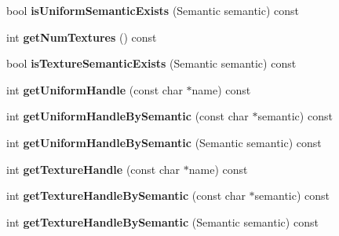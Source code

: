 \begin{DoxyCompactItemize}
\item 
bool {\bfseries is\+Uniform\+Semantic\+Exists} (Semantic semantic) const \hypertarget{class_magnum_1_1_visual_effect_a49f472caf85fc12e50f760351d88979e}{}\label{class_magnum_1_1_visual_effect_a49f472caf85fc12e50f760351d88979e}

\item 
int {\bfseries get\+Num\+Textures} () const \hypertarget{class_magnum_1_1_visual_effect_a121cbbb66895b72a28629018d3183135}{}\label{class_magnum_1_1_visual_effect_a121cbbb66895b72a28629018d3183135}

\item 
bool {\bfseries is\+Texture\+Semantic\+Exists} (Semantic semantic) const \hypertarget{class_magnum_1_1_visual_effect_a89217c847d6da54f695be16a5cd380e8}{}\label{class_magnum_1_1_visual_effect_a89217c847d6da54f695be16a5cd380e8}

\item 
int {\bfseries get\+Uniform\+Handle} (const char $\ast$name) const \hypertarget{class_magnum_1_1_visual_effect_a11c2a56182b50acc70e1439ed9762866}{}\label{class_magnum_1_1_visual_effect_a11c2a56182b50acc70e1439ed9762866}

\item 
int {\bfseries get\+Uniform\+Handle\+By\+Semantic} (const char $\ast$semantic) const \hypertarget{class_magnum_1_1_visual_effect_ad5d704d0d6c97d3cb1677f45ebfa6246}{}\label{class_magnum_1_1_visual_effect_ad5d704d0d6c97d3cb1677f45ebfa6246}

\item 
int {\bfseries get\+Uniform\+Handle\+By\+Semantic} (Semantic semantic) const \hypertarget{class_magnum_1_1_visual_effect_aca80cfbfe9edeb66f4a7081d0634ffd0}{}\label{class_magnum_1_1_visual_effect_aca80cfbfe9edeb66f4a7081d0634ffd0}

\item 
int {\bfseries get\+Texture\+Handle} (const char $\ast$name) const \hypertarget{class_magnum_1_1_visual_effect_a8ce776bb080171791598c271ca458bf5}{}\label{class_magnum_1_1_visual_effect_a8ce776bb080171791598c271ca458bf5}

\item 
int {\bfseries get\+Texture\+Handle\+By\+Semantic} (const char $\ast$semantic) const \hypertarget{class_magnum_1_1_visual_effect_a4c45b4ad5c6083c996e2f72d752a02a1}{}\label{class_magnum_1_1_visual_effect_a4c45b4ad5c6083c996e2f72d752a02a1}

\item 
int {\bfseries get\+Texture\+Handle\+By\+Semantic} (Semantic semantic) const \hypertarget{class_magnum_1_1_visual_effect_a8b78f057f6c0b24f3a1160884c0ff90a}{}\label{class_magnum_1_1_visual_effect_a8b78f057f6c0b24f3a1160884c0ff90a}


\end{DoxyCompactItemize}
